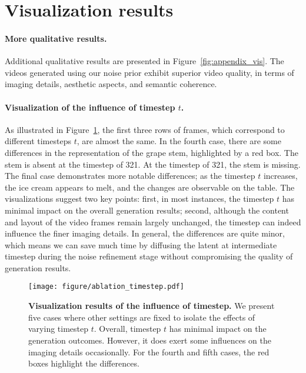 \section{Visualization results}
\paragraph{More qualitative results.} 
Additional qualitative results are presented in Figure~\ref{fig:appendix_vis}. 
The videos generated using our noise prior exhibit superior video quality, in terms of imaging details, aesthetic aspects, and semantic coherence.
\paragraph{Visualization of the influence of timestep \boldmath$t$.} 
As illustrated in Figure~\ref{fig:ablation_timestep},  the first three rows of frames, which correspond to different timesteps $t$, are almost the same.
In the fourth case, there are some differences in the representation of the grape stem, highlighted by a red box. The stem is absent at the timestep of 321. 
At the timestep of 321, the stem is missing. 
The final case demonstrates more notable differences; as the timestep $t$ increases, the ice cream appears to melt, and the changes are observable on the table.
The visualizations suggest two key points: first, in most instances, the timestep 
$t$ has minimal impact on the overall generation results; second, although the content and layout of the video frames remain largely unchanged, the timestep can indeed influence the finer imaging details.
In general, the differences are quite minor, which means we can save much time by diffusing the latent at intermediate timestep during the noise refinement stage without compromising the quality of generation results.

\begin{figure}[t]
    \centering
    \texttt{[image: figure/ablation\_timestep.pdf]}
    \caption{ \textbf{Visualization results of the influence of timestep.} We present five cases where other settings are fixed to isolate the effects of varying timestep $t$. Overall, timestep $t$ has minimal impact on the generation outcomes. However, it does exert some influences on the imaging details occasionally. For the fourth and fifth cases, the red boxes highlight the differences.}
    \label{fig:ablation_timestep}
\end{figure}

